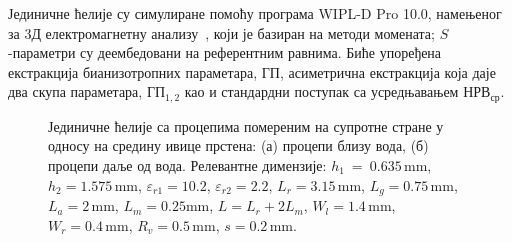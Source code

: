 Јединичне ћелије су симулиране помоћу програма WIPL-D Pro 10.0, намењеног за 3Д електромагнетну анализу~\cite{wipl}, који је базиран на методи момената; $S$-параметри су деембедовани на референтним равнима. Биће упоређена екстракција бианизотропних параметара, $ГП$, асиметрична екстракција која даје два скупа параметара, $ГП_{1,2}$ као и стандардни поступак са усредњавањем $НРВ_{ср}$.
\begin{figure}[!t]
\hfill
{}
\caption{Јединичне ћелије са процепима помереним на супротне стране у односу на средину ивице прстена: (а) процепи близу вода, (б) процепи даље од вода. Релевантне димензије: $h_1~=~0.635\,\mathrm{mm}$, $h_2=1.575\,\mathrm{mm}$, $\varepsilon_{r1}=10.2$, $\varepsilon_{r2}=2.2$, $L_r=3.15\,\mathrm{mm}$, $L_g=0.75\,\mathrm{mm}$, $L_a=2\,\mathrm{mm}$, $L_m=0.25\mathrm{mm}$, $L= L_r +2L_m$, $W_l=1.4\,\mathrm{mm}$, $W_r=0.4\,\mathrm{mm}$, $R_v=0.5\,\mathrm{mm}$, $s=0.2\,\mathrm{mm}$.}
\label{fig4}
\end{figure}

